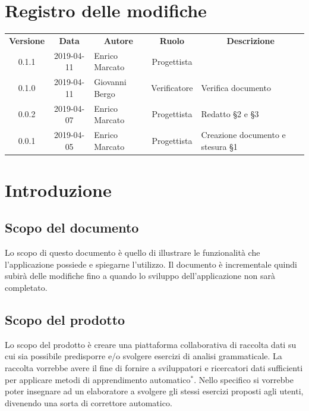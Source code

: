 \documentclass[11pt,a4paper]{article}
\begin{document}
	
	
	{\def\arraystretch{2}\tabcolsep=10pt
	\newpage
	\section*{\centering Registro delle modifiche}
	\begin{tabularx}{\textwidth}{ c | c | p{3.80cm} | c | X }
		\rowcolor{LightBlue}
		\color{white}\bfseries Versione & \color{white}\bfseries Data & \multicolumn{1}{c}{\color{white}\bfseries Autore}
		& \color{white}\bfseries Ruolo & \multicolumn{1}{c}{\color{white}\bfseries Descrizione}\\[0.25cm]
		0.1.1 & 2019-04-11 & Enrico Marcato & Progettista &  \\ \hline
		0.1.0 & 2019-04-11 & Giovanni Bergo & Verificatore & Verifica documento \\ \hline
		0.0.2 & 2019-04-07 & Enrico Marcato & Progettista & Redatto \S2 e \S3 \\ \hline
		0.0.1 & 2019-04-05 & Enrico Marcato & Progettista & Creazione documento e stesura \S1 \\ 
	 \hline		
	\end{tabularx}
	
	\newpage	
	
	\renewcommand  \contentsname {\Large Indice} 
	
	\tableofcontents
	\newpage
	\listoffigures

	\newpage
	
	\section{Introduzione}
	\subsection{Scopo del documento}
	Lo scopo di questo documento è quello di illustrare le funzionalità che l'applicazione possiede e spiegarne l'utilizzo. Il documento è incrementale quindi subirà delle modifiche fino a quando lo sviluppo dell'applicazione non sarà completato.
	\subsection{Scopo del prodotto}
	Lo scopo del prodotto è creare una piattaforma collaborativa di raccolta dati su cui sia possibile predisporre e/o svolgere esercizi di analisi grammaticale. La raccolta vorrebbe avere il fine di fornire a sviluppatori e ricercatori dati sufficienti per applicare metodi di apprendimento automatico$^*$. Nello specifico si vorrebbe poter insegnare ad un elaboratore a svolgere gli stessi esercizi proposti agli utenti, divenendo una sorta di correttore automatico.
	
}
\end{document}

